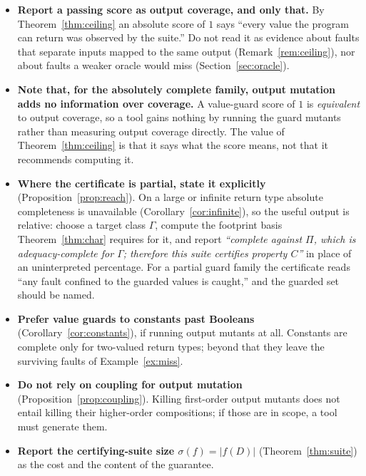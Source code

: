 \documentclass[runningheads,envcountsect,envcountsame]{llncs}
\begin{document}
\begin{itemize}
\item \textbf{Report a passing score as output coverage, and only that.} By
Theorem~\ref{thm:ceiling} an absolute score of $1$ says ``every value the program
can return was observed by the suite.'' Do not read it as evidence about faults
that separate inputs mapped to the same output (Remark~\ref{rem:ceiling}), nor
about faults a weaker oracle would miss (Section~\ref{sec:oracle}).

\item \textbf{Note that, for the absolutely complete family, output mutation adds
no information over coverage.} A value-guard score of $1$ is \emph{equivalent} to
output coverage, so a tool gains nothing by running the guard mutants rather than
measuring output coverage directly. The value of Theorem~\ref{thm:ceiling} is
that it says what the score means, not that it recommends computing it.

\item \textbf{Where the certificate is partial, state it explicitly}
(Proposition~\ref{prop:reach}). On a large or infinite return type absolute
completeness is unavailable (Corollary~\ref{cor:infinite}), so the useful output
is relative: choose a target class $\Gamma$, compute the footprint basis
Theorem~\ref{thm:char} requires for it, and report \emph{``complete against
$\Pi$, which is adequacy-complete for $\Gamma$; therefore this suite certifies
property $C$''} in place of an uninterpreted percentage. For a partial guard
family the certificate reads ``any fault confined to the guarded values is
caught,'' and the guarded set should be named.

\item \textbf{Prefer value guards to constants past Booleans}
(Corollary~\ref{cor:constants}), if running output mutants at all. Constants are
complete only for two-valued return types; beyond that they leave the surviving
faults of Example~\ref{ex:miss}.

\item \textbf{Do not rely on coupling for output mutation}
(Proposition~\ref{prop:coupling}). Killing first-order output mutants does not
entail killing their higher-order compositions; if those are in scope, a tool
must generate them.

\item \textbf{Report the certifying-suite size $\sigma(f) = |f(D)|$}
(Theorem~\ref{thm:suite}) as the cost and the content of the guarantee.
\end{itemize}
\end{document}

